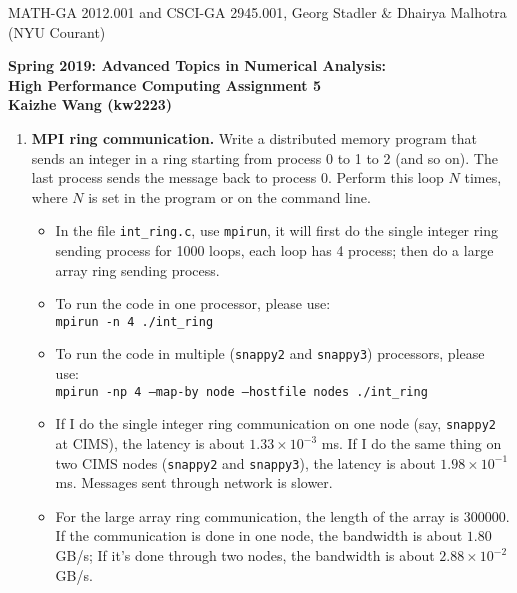 \documentclass[12pt]{article}
\begin{document}
\begin{center}
  \vspace*{-2cm}
{\small MATH-GA 2012.001 and CSCI-GA 2945.001, Georg Stadler \&
  Dhairya Malhotra (NYU Courant)}
\end{center}
\vspace*{.5cm}
\begin{center}
\large \textbf{%
Spring 2019: Advanced Topics in Numerical Analysis: \\
High Performance Computing Assignment 5\\
Kaizhe Wang (kw2223)}
\end{center}

\begin{enumerate}

\item {\bf MPI ring communication.}  Write a distributed memory
  program that sends an integer in a ring starting from process 0 to 1
  to 2 (and so on). The last process sends the message back to process
  0. Perform this loop $N$ times, where $N$ is set in the program or
  on the command line.
  \begin{itemize}
  \item In the file \texttt{int\_ring.c}, use \texttt{mpirun}, it will first do the single integer ring sending process for 1000 loops, each loop has 4 process; then do a large array ring sending process. 
  \item To run the code in one processor, please use: \\ \texttt{mpirun -n 4 ./int\_ring}
  \item To run the code in multiple (\texttt{snappy2} and \texttt{snappy3}) processors, please use: \\ \texttt{mpirun -np 4 --map-by node --hostfile nodes ./int\_ring}
  \item If I do the single integer ring communication on one node (say, \texttt{snappy2} at CIMS), the latency is about $1.33 \times 10^{-3}$ ms. If I do the same thing on two CIMS nodes (\texttt{snappy2} and \texttt{snappy3}), the latency is about $1.98 \times 10^{-1}$ ms. Messages sent through network is slower.
  \item For the large array ring communication, the length of the array is $300000$. If the communication is done in one node, the bandwidth is about $1.80$ GB/s; If it's done through two nodes, the bandwidth is about $2.88 \times 10^{-2}$ GB/s.
  \end{itemize}



\end{enumerate}
\end{document}
